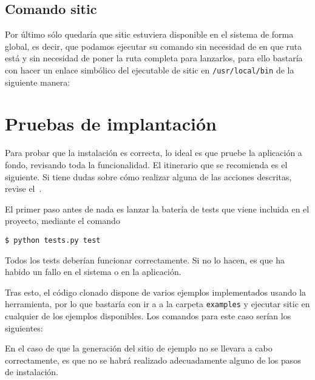 \subsection{Comando sitic}

Por último sólo quedaría que sitic estuviera disponible en el sistema de forma global, es decir,
que podamos ejecutar su comando sin necesidad de en que ruta está y sin necesidad de poner la ruta completa
para lanzarlos, para ello bastaría con hacer un enlace simbólico del ejecutable de sitic en
\texttt{/usr/local/bin} de la siguiente manera:


\section{Pruebas de implantación}

Para probar que la instalación es correcta, lo ideal es que pruebe la aplicación
a fondo, revisando toda la funcionalidad. El itinerario que se recomienda es el
siguiente. Si tiene dudas sobre cómo realizar alguna de las acciones descritas,
revise el~.

El primer paso antes de nada es lanzar la batería de tests que viene incluida en
el proyecto, mediante el comando

\begin{verbatim}
$ python tests.py test
\end{verbatim}

Todos los tests deberían funcionar correctamente. Si no lo hacen, es que ha
habido un fallo en el sistema o en la aplicación.

Tras esto, el código clonado dispone de varios ejemplos implementados usando la herramienta,
por lo que bastaría con ir a a la carpeta \texttt{examples} y ejecutar sitic en cualquier
de los ejemplos disponibles. Los comandos para este caso serían los siguientes:


En el caso de que la generación del sitio de ejemplo no se llevara a cabo
correctamente, es que no se habrá realizado adecuadamente alguno de los pasos de instalación.
